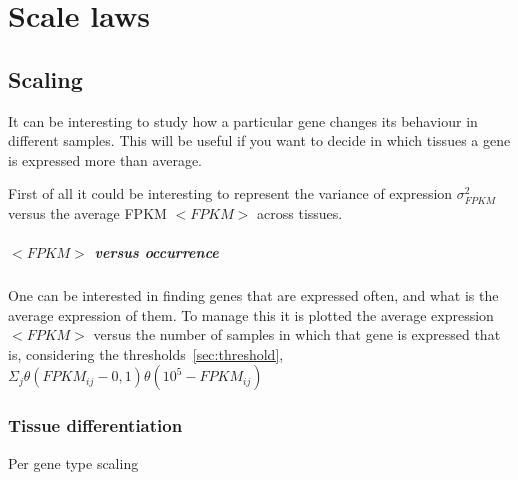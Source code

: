\chapter{Scale laws}\label{ch:scalelaws}

\section{Scaling}
It can be interesting to study how a particular gene changes its behaviour in different samples. 
This will be useful if you want to decide in which tissues a gene is expressed more than average.

First of all it could be interesting to represent the variance of expression $\sigma^2_{FPKM}$ versus 
the average FPKM $<FPKM>$ across tissues.





\paragraph{$<FPKM>$ versus occurrence}
One can be interested in finding genes that are expressed often, and what is the 
average expression of them.
To manage this it is plotted the average expression $<FPKM>$ versus the number 
of samples in which that gene is expressed that is, considering the thresholds~\ref{sec:threshold}, 
$\Sigma_j\theta (FPKM_{ij}-0,1)\theta (10^5-FPKM_{ij})$

\subsection{Tissue differentiation}
Per gene type scaling




